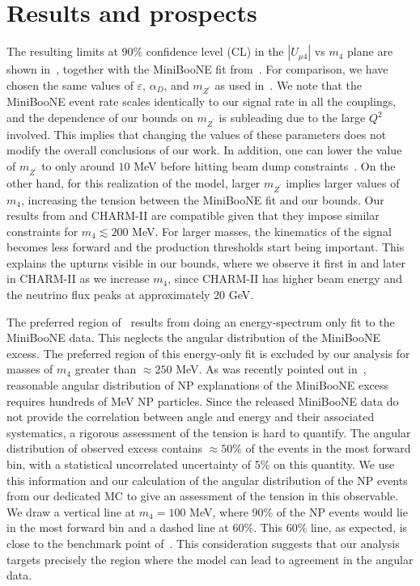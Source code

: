 \section{Results and prospects}

The resulting limits at 90\% confidence level (CL)  in the $|U_{\mu 4}|$ vs $m_4$ plane are shown in~, together with the MiniBooNE fit from~\cite{Bertuzzo:2018itn}. For comparison, we have chosen the same values of $\varepsilon$, $\alpha_D$, and $m_{Z^\prime}$ as used in~\cite{Bertuzzo:2018itn}. 
We note that the MiniBooNE event rate scales identically to our signal rate in all the couplings, and the dependence of our bounds on $m_{Z^\prime}$ is subleading due to the large $Q^2$ involved. 
This implies that changing the values of these parameters does not modify the overall conclusions of our work. In addition, one can lower the value of $m_{Z^\prime}$ to only around $10$ MeV before hitting beam dump constraints~\cite{Bauer:2018onh}. 
On the other hand, for this realization of the model, larger $m_{Z^\prime}$ implies larger values of $m_4$, increasing the tension between the MiniBooNE fit and our bounds.
Our results from \minerva and CHARM-II are compatible given that 
they impose similar constraints for $m_4 \lesssim 200 $ MeV. For larger masses, the kinematics of the signal becomes less forward and the production thresholds start being important. This explains the upturns visible in our bounds, where we observe it first in \minerva and later in CHARM-II as we increase $m_4$, since CHARM-II has higher beam energy and the neutrino flux peaks at approximately 20 GeV.

The preferred region of~\cite{Bertuzzo:2018itn} results from doing an energy-spectrum only fit to the MiniBooNE data. This neglects the angular distribution of the MiniBooNE excess. The preferred region of this energy-only fit is excluded by our analysis for masses of $m_4$ greater than $\approx 250$ MeV. As was recently pointed out in~\cite{Jordan:2018qiy}, reasonable angular distribution of NP explanations of the MiniBooNE excess requires hundreds of MeV NP particles.
Since the released MiniBooNE data do not provide the correlation between angle and energy and their associated systematics, a rigorous assessment of the tension is hard to quantify. The angular distribution of observed excess contains $\approx 50\%$ of the events in the most forward bin, with a statistical uncorrelated uncertainty of 5\% on this quantity.
We use this information and our calculation of the angular distribution of the NP events from our dedicated MC to give an assessment of the tension in this observable. We draw a vertical line at $m_4 = 100$ MeV, where 90\% of the NP events would lie in the most forward bin and a dashed line at 60\%. 
This 60\% line, as expected, is close to the benchmark point of~\cite{Bertuzzo:2018ftf}. This consideration suggests that our analysis targets precisely the region where the model can lead to agreement in the angular data. 

